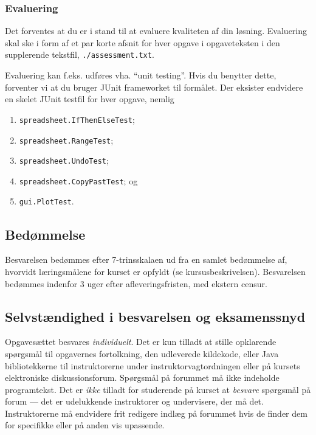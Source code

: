 \subsubsection{Evaluering}

Det forventes at du er i stand til at evaluere kvaliteten af din løsning. Evaluering skal ske i form af et par korte afsnit for hver opgave i opgaveteksten i den supplerende tekstfil, \texttt{./assessment.txt}.

Evaluering kan f.eks. udføres vha. ``unit testing''. Hvis du benytter dette, forventer vi at du bruger JUnit frameworket til formålet. Der eksister endvidere en skelet
JUnit testfil for hver opgave, nemlig

\begin{enumerate}

\item \texttt{spreadsheet.IfThenElseTest};

\item \texttt{spreadsheet.RangeTest};

\item \texttt{spreadsheet.UndoTest};

\item \texttt{spreadsheet.CopyPastTest}; og

\item \texttt{gui.PlotTest}.

\end{enumerate}

\subsection{Bedømmelse}

Besvarelsen bedømmes efter 7-trinsskalaen ud fra en samlet bedømmelse af,
hvorvidt læringsmålene for kurset er opfyldt (se kursusbeskrivelsen).
Besvarelsen bedømmes indenfor 3 uger efter afleveringsfristen, med ekstern
censur.

\subsection{Selvstændighed i besvarelsen og eksamenssnyd}

Opgavesættet besvares \emph{individuelt}. Det er kun tilladt at stille
opklarende spørgsmål til opgavernes fortolkning, den udleverede kildekode,
eller Java bibliotekkerne til instruktorerne under instruktorvagtordningen
eller på kursets elektroniske diskussionsforum. Spørgsmål på forummet må ikke
indeholde programtekst. Det er \emph{ikke} tilladt for studerende på kurset at
\emph{besvare} spørgsmål på forum --- det er udelukkende instruktorer og
undervisere, der må det. Instruktorerne må endvidere frit redigere indlæg på
forummet hvis de finder dem for specifikke eller på anden vis upassende.

